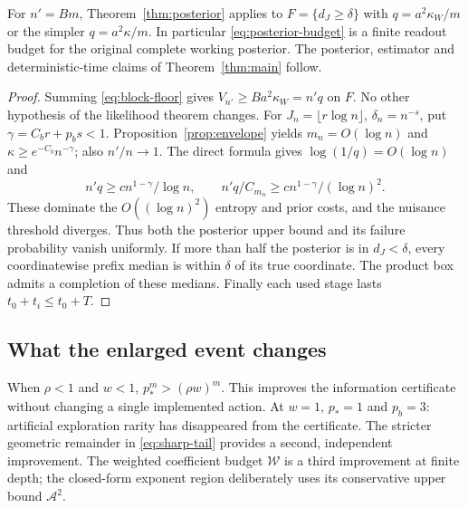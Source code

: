 \begin{theorem}
\label{thm:block-posterior}
For $n'=Bm$, Theorem~\ref{thm:posterior} applies to
$F=\{d_J\ge\delta\}$ with $q=a^2\kappa_W/m$ or the simpler
$q=a^2\kappa/m$. In particular \eqref{eq:posterior-budget} is a finite
readout budget for the original complete working posterior. The posterior,
estimator and deterministic-time claims of Theorem~\ref{thm:main} follow.
\end{theorem}
\begin{proof}
Summing \eqref{eq:block-floor} gives $V_{n'}\ge Ba^2\kappa_W=n'q$ on $F$.
No other hypothesis of the likelihood theorem changes.
For $J_n=\lfloor r\log n\rfloor$, $\delta_n=n^{-s}$, put
$\gamma=C_br+p_bs<1$. Proposition~\ref{prop:envelope} yields
$m_n=O(\log n)$ and $\kappa\ge e^{-C_b}n^{-\gamma}$; also $n'/n\to1$.
The direct formula gives $\log(1/q)=O(\log n)$ and
\[
 n'q\ge c n^{1-\gamma}/\log n,\qquad
 n'q/C_{m_n}\ge c n^{1-\gamma}/(\log n)^2.
\]
These dominate the $O((\log n)^2)$ entropy and prior costs, and the nuisance
threshold diverges. Thus both the posterior upper bound and its failure
probability vanish uniformly. If more than half the posterior is in
$d_J<\delta$, every coordinatewise prefix median is within $\delta$ of
its true coordinate. The product box admits a completion of these medians.
Finally each used stage lasts $t_0+t_i\le t_0+T$.
\end{proof}

\subsection{What the enlarged event changes}
When $\rho<1$ and $w<1$, $p_*^m>(\rho w)^m$. This improves the information
certificate without changing a single implemented action. At $w=1$,
$p_*=1$ and $p_b=3$: artificial exploration rarity has disappeared from the
certificate. The stricter geometric remainder in \eqref{eq:sharp-tail}
provides a second, independent improvement. The weighted coefficient budget
$\mathcal W$ is a third improvement at finite depth; the closed-form exponent
region deliberately uses its conservative upper bound $\mathcal A^2$.
